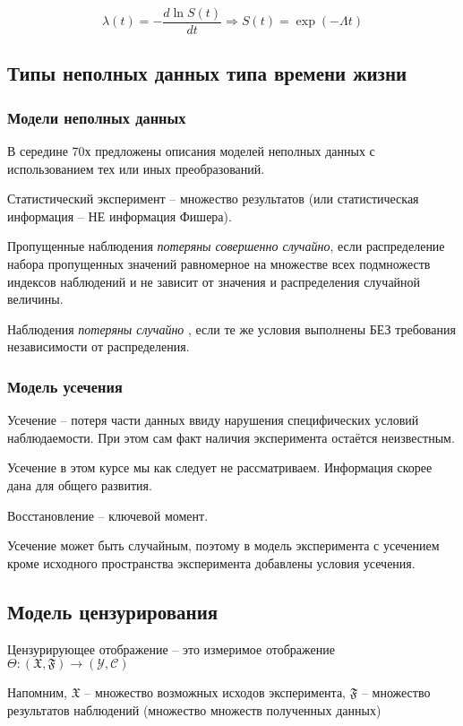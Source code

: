 \documentclass[main.tex]{sufbfiles}
\begin{document}
\[ \lambda(t) = - \frac{d \ln S(t)}{dt} \Rightarrow S(t) = \exp (- \Lambda t) \]

\subsection{Типы неполных данных типа времени жизни}

\subsubsection{Модели неполных данных}

В середине 70х предложены описания моделей неполных данных с использованием тех или иных преобразований.

Статистический эксперимент -- множество результатов (или статистическая информация -- НЕ информация Фишера).

Пропущенные наблюдения \emph{потеряны совершенно случайно}, если распределение набора пропущенных значений равномерное на множестве всех подмножеств индексов наблюдений и не зависит от значения и распределения случайной величины.

Наблюдения \emph{ потеряны случайно }, если те же условия выполнены БЕЗ требования независимости от распределения.

\subsubsection{Модель усечения}

Усечение -- потеря части данных ввиду нарушения специфических условий наблюдаемости.
При этом сам факт наличия эксперимента остаётся неизвестным.

Усечение в этом курсе мы как следует не рассматриваем.
Информация скорее дана для общего развития.

Восстановление -- ключевой момент.

Усечение может быть случайным, поэтому в модель эксперимента с усечением кроме исходного пространства эксперимента добавлены условия усечения.

\subsection{ Модель цензурирования }

Цензурирующее отображение -- это измеримое отображение $ \Theta :  (\mathfrak X, \mathfrak F) \to (\mathcal Y, \mathcal C) $ 

\begin{leftbar}
	Напомним, $ \mathfrak X $ -- множество возможных исходов эксперимента, $ \mathfrak F $ -- множество результатов наблюдений (множество множеств полученных данных)
\end{leftbar}
\end{document}
